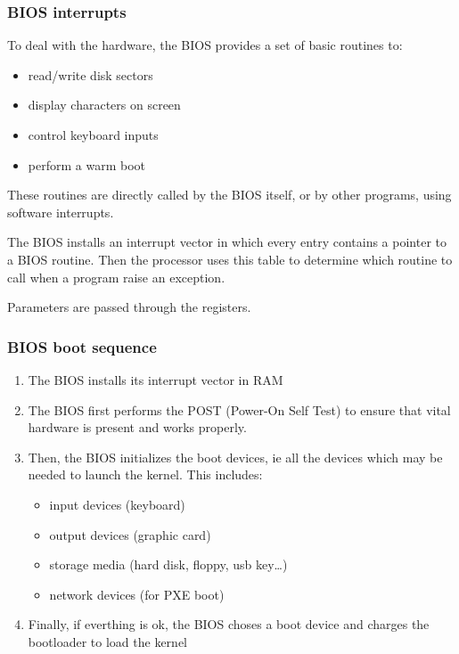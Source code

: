 %
%
%

\begin{frame}
  \frametitle{BIOS interrupts}

  To deal with the hardware, the BIOS provides a set of basic routines to:

  \begin{itemize}
  \item read/write disk sectors
  \item display characters on screen
  \item control keyboard inputs
  \item perform a warm boot
  \end{itemize}

  \-

  These routines are directly called by the BIOS itself, or by other programs, using software interrupts.

  \-

  The BIOS installs an interrupt vector in which every entry contains a pointer to a BIOS routine. Then the processor uses this table to determine which routine to call when a program raise an exception.

  \-

  Parameters are passed through the registers.

\end{frame}

%
%
%

\begin{frame}
  \frametitle{BIOS boot sequence}

  \begin{enumerate}

  \item The BIOS installs its interrupt vector in RAM

  \-

  \item The BIOS first performs the POST (Power-On Self Test) to ensure that vital hardware is present and works properly.

  \-

  \item Then, the BIOS initializes the boot devices, ie all the devices which may be needed to launch the kernel. This includes:

  \-

  \begin{itemize}
  \item input devices (keyboard)
  \item output devices (graphic card)
  \item storage media (hard disk, floppy, usb key\ldots)
  \item network devices (for PXE boot)
  \end{itemize}

  \-

  \item Finally, if everthing is ok, the BIOS choses a boot device and charges the bootloader to load the kernel
  \end{enumerate}

\end{frame}

